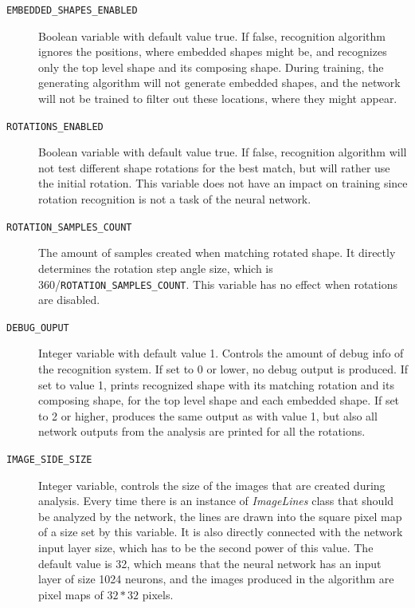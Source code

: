 \begin{description}
\item[\texttt{EMBEDDED\_SHAPES\_ENABLED}] Boolean variable with default value true. If false, recognition algorithm ignores the positions, where embedded shapes might be, and recognizes only the top level shape and its composing shape. During training, the generating algorithm will not generate embedded shapes, and the network will not be trained to filter out these locations, where they might appear.

\item[\texttt{ROTATIONS\_ENABLED}] Boolean variable with default value true. If false, recognition algorithm will not test different shape rotations for the best match, but will rather use the initial rotation. This variable does not have an impact on training since rotation recognition is not a task of the neural network.

\item[\texttt{ROTATION\_SAMPLES\_COUNT}] The amount of samples created when matching rotated shape. It directly determines the rotation step angle size, which is 360/\texttt{ROTATION\_SAMPLES\_COUNT}. This variable has no effect when rotations are disabled.

\item[\texttt{DEBUG\_OUPUT}] Integer variable with default value 1. Controls the amount of debug info of the recognition system. If set to 0 or lower, no debug output is produced. If set to value 1, prints recognized shape with its matching rotation and its composing shape, for the top level shape and each embedded shape. If set to 2 or higher, produces the same output as with value 1, but also all network outputs from the analysis are printed for all the rotations.

\item[\texttt{IMAGE\_SIDE\_SIZE}] Integer variable, controls the size of the images that are created during analysis. Every time there is an instance of \emph{ImageLines} class that should be analyzed by the network, the lines are drawn into the square pixel map of a size set by this variable. It is also directly connected with the network input layer size, which has to be the second power of this value. The default value is 32, which means that the neural network has an input layer of size 1024 neurons, and the images produced in the algorithm are pixel maps of $32*32$ pixels.

\end{description}

